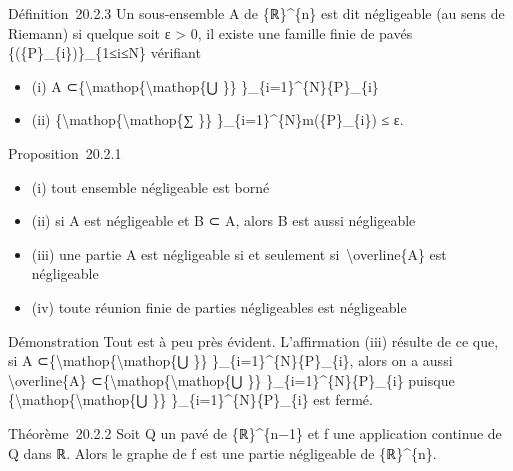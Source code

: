 \documentclass[]{article}
\begin{document}
Définition~20.2.3 Un sous-ensemble A de \{ℝ\}\^{}\{n\} est dit
négligeable (au sens de Riemann) si quelque soit ε \textgreater{} 0, il
existe une famille finie de pavés \{(\{P\}\_\{i\})\}\_\{1≤i≤N\}
vérifiant

\begin{itemize}
\itemsep1pt\parskip0pt
\item
  (i) A ⊂\{\textbackslash{}mathop\{\textbackslash{}mathop\{⋃ \}\}
  \}\_\{i=1\}\^{}\{N\}\{P\}\_\{i\}
\item
  (ii) \{\textbackslash{}mathop\{\textbackslash{}mathop\{∑ \}\}
  \}\_\{i=1\}\^{}\{N\}m(\{P\}\_\{i\}) ≤ ε.
\end{itemize}

Proposition~20.2.1

\begin{itemize}
\itemsep1pt\parskip0pt
\item
  (i) tout ensemble négligeable est borné
\item
  (ii) si A est négligeable et B ⊂ A, alors B est aussi négligeable
\item
  (iii) une partie A est négligeable si et seulement
  si~\textbackslash{}overline\{A\} est négligeable
\item
  (iv) toute réunion finie de parties négligeables est négligeable
\end{itemize}

Démonstration Tout est à peu près évident. L'affirmation (iii) résulte
de ce que, si A ⊂\{\textbackslash{}mathop\{\textbackslash{}mathop\{⋃
\}\} \}\_\{i=1\}\^{}\{N\}\{P\}\_\{i\}, alors on a aussi
\textbackslash{}overline\{A\}
⊂\{\textbackslash{}mathop\{\textbackslash{}mathop\{⋃ \}\}
\}\_\{i=1\}\^{}\{N\}\{P\}\_\{i\} puisque
\{\textbackslash{}mathop\{\textbackslash{}mathop\{⋃ \}\}
\}\_\{i=1\}\^{}\{N\}\{P\}\_\{i\} est fermé.

Théorème~20.2.2 Soit Q un pavé de \{ℝ\}\^{}\{n−1\} et f une application
continue de Q dans ℝ. Alors le graphe de f est une partie négligeable de
\{ℝ\}\^{}\{n\}.
\end{document}
